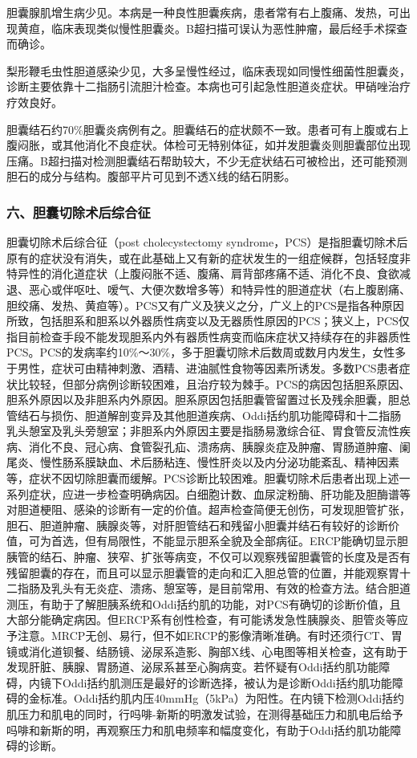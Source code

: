 胆囊腺肌增生病少见。本病是一种良性胆囊疾病，患者常有右上腹痛、发热，可出现黄疸，临床表现类似慢性胆囊炎。B超扫描可误认为恶性肿瘤，最后经手术探查而确诊。

梨形鞭毛虫性胆道感染少见，大多呈慢性经过，临床表现如同慢性细菌性胆囊炎，诊断主要依靠十二指肠引流胆汁检查。本病也可引起急性胆道炎症状。甲硝唑治疗疗效良好。

胆囊结石约70\%胆囊炎病例有之。胆囊结石的症状颇不一致。患者可有上腹或右上腹闷胀，或其他消化不良症状。体检可无特别体征，如并发胆囊炎则胆囊部位出现压痛。B超扫描对检测胆囊结石帮助较大，不少无症状结石可被检出，还可能预测胆石的成分与结构。腹部平片可见到不透X线的结石阴影。

\subsubsection{六、胆囊切除术后综合征}

胆囊切除术后综合征（post cholecystectomy
syndrome，PCS）是指胆囊切除术后原有的症状没有消失，或在此基础上又有新的症状发生的一组症候群，包括轻度非特异性的消化道症状（上腹闷胀不适、腹痛、肩背部疼痛不适、消化不良、食欲减退、恶心或伴呕吐、嗳气、大便次数增多等）和特异性的胆道症状（右上腹剧痛、胆绞痛、发热、黄疸等）。PCS又有广义及狭义之分，广义上的PCS是指各种原因所致，包括胆系和胆系以外器质性病变以及无器质性原因的PCS；狭义上，PCS仅指目前检查手段不能发现胆系内外有器质性病变而临床症状又持续存在的非器质性PCS。PCS的发病率约10\%～30\%，多于胆囊切除术后数周或数月内发生，女性多于男性，症状可由精神刺激、酒精、进油腻性食物等因素所诱发。多数PCS患者症状比较轻，但部分病例诊断较困难，且治疗较为棘手。PCS的病因包括胆系原因、胆系外原因以及非胆系内外原因。胆系原因包括胆囊管留置过长及残余胆囊，胆总管结石与损伤、胆道解剖变异及其他胆道疾病、Oddi括约肌功能障碍和十二指肠乳头憩室及乳头旁憩室；非胆系内外原因主要是指肠易激综合征、胃食管反流性疾病、消化不良、冠心病、食管裂孔疝、溃疡病、胰腺炎症及肿瘤、胃肠道肿瘤、阑尾炎、慢性肠系膜缺血、术后肠粘连、慢性肝炎以及内分泌功能紊乱、精神因素等，症状不因切除胆囊而缓解。PCS诊断比较困难。胆囊切除术后患者出现上述一系列症状，应进一步检查明确病因。白细胞计数、血尿淀粉酶、肝功能及胆酶谱等对胆道梗阻、感染的诊断有一定的价值。超声检查简便无创伤，可发现胆管扩张，胆石、胆道肿瘤、胰腺炎等，对肝胆管结石和残留小胆囊并结石有较好的诊断价值，可为首选，但有局限性，不能显示胆系全貌及全部病征。ERCP能确切显示胆胰管的结石、肿瘤、狭窄、扩张等病变，不仅可以观察残留胆囊管的长度及是否有残留胆囊的存在，而且可以显示胆囊管的走向和汇入胆总管的位置，并能观察胃十二指肠及乳头有无炎症、溃疡、憩室等，是目前常用、有效的检查方法。结合胆道测压，有助于了解胆胰系统和Oddi括约肌的功能，对PCS有确切的诊断价值，且大部分能确定病因。但ERCP系有创性检查，有可能诱发急性胰腺炎、胆管炎等应予注意。MRCP无创、易行，但不如ERCP的影像清晰准确。有时还须行CT、胃镜或消化道钡餐、结肠镜、泌尿系造影、胸部X线、心电图等相关检查，这有助于发现肝脏、胰腺、胃肠道、泌尿系甚至心胸病变。若怀疑有Oddi括约肌功能障碍，内镜下Oddi括约肌测压是最好的诊断选择，被认为是诊断Oddi括约肌功能障碍的金标准。Oddi括约肌内压40mmHg（5kPa）为阳性。在内镜下检测Oddi括约肌压力和肌电的同时，行吗啡-新斯的明激发试验，在测得基础压力和肌电后给予吗啡和新斯的明，再观察压力和肌电频率和幅度变化，有助于Oddi括约肌功能障碍的诊断。

